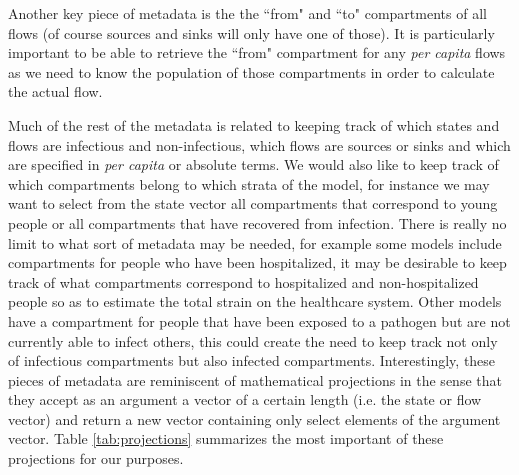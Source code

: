 Another key piece of metadata is the the ``from" and ``to" compartments of all flows (of course sources and sinks will only have one of those). It is particularly important to be able to retrieve the ``from" compartment for any \emph{per capita} flows as we need to know the population of those compartments in order to calculate the actual flow. 


Much of the rest of the metadata is related to keeping track of which states and flows are infectious and non-infectious, which flows are sources or sinks and which are specified in \emph{per capita} or absolute terms. We would also like to keep track of which compartments belong to which strata of the model, for instance we may want to select from the state vector all compartments that correspond to young people or all compartments that have recovered from infection. There is really no limit to what sort of metadata may be needed, for example some models include compartments for people who have been hospitalized, it may be desirable to keep track of what compartments correspond to hospitalized and non-hospitalized people so as to estimate the total strain on the healthcare system. Other models have a compartment for people that have been exposed to a pathogen but are not currently able to infect others, this could create the need to keep track not only of infectious compartments but also infected compartments. Interestingly, these pieces of metadata are reminiscent of mathematical projections in the sense that they accept as an argument a vector of a certain length (i.e. the state or flow vector) and return a new vector containing only select elements of the argument vector. Table \ref{tab:projections} summarizes the most important of these projections for our purposes.

